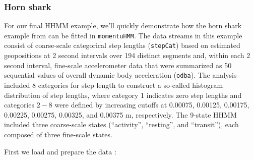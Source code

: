 \documentclass[12pt]{article}\usepackage[]{graphicx}\usepackage[]{xcolor}
\begin{document}
\subsubsection{Horn shark}
\label{sec:hornShark}
For our final HHMM example, we'll quickly demonstrate how the horn shark example from \cite{AdamEtAl2019} can be fitted in \verb|momentuHMM|. The data streams in this example consist of coarse-scale categorical step lengths (\verb|stepCat|) based on estimated geopositions at 2 second intervals over 194 distinct segments and, within each 2 second interval, fine-scale accelerometer data that were summarized as 50 sequential values of overall dynamic body acceleration (\verb|odba|). The analysis included 8 categories for step length to construct a so-called histogram distribution of step lengths, where category 1 indicates zero step lengths and categories $2-8$ were defined by increasing cutoffs at 0.00075, 0.00125, 0.00175, 0.00225, 0.00275, 0.00325, and 0.00375 m, respectively. The 9-state HHMM included three coarse-scale states (``activity'', ``resting'', and ``transit''), each composed of three fine-scale states.

First we load and prepare the data \citep[available for download from][]{AdamEtAl2019}:
\end{document}
